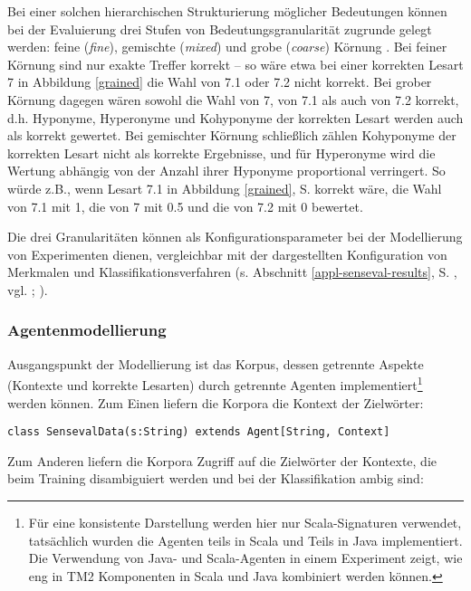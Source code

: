 \documentclass[abstracton, 12pt]{scrartcl}
\begin{document}
Bei einer solchen hierarchischen Strukturierung möglicher Bedeutungen können bei der Evaluierung drei Stufen von Bedeutungsgranularität zugrunde gelegt werden: feine (\emph{fine}), gemischte (\emph{mixed}) und grobe (\emph{coarse}) Körnung \citep[79]{PalmerEtAl2006}. Bei feiner Körnung sind nur exakte Treffer korrekt -- so wäre etwa bei einer korrekten Lesart 7 in Abbildung \ref{grained} die Wahl von 7.1 oder 7.2 nicht korrekt. Bei grober Körnung dagegen wären sowohl die Wahl von 7, von 7.1 als auch von 7.2 korrekt, d.h. Hyponyme, Hyperonyme und Kohyponyme der korrekten Lesart werden auch als korrekt gewertet. Bei gemischter Körnung schließlich zählen Kohyponyme der korrekten Lesart nicht als korrekte Ergebnisse, und für Hyperonyme wird die Wertung abhängig von der Anzahl ihrer Hyponyme proportional verringert. So würde z.B., wenn Lesart 7.1 in Abbildung \ref{grained}, S. \pageref{grained} korrekt wäre, die Wahl von 7.1 mit 1, die von 7 mit 0.5 und die von 7.2 mit 0 bewertet. 

Die drei Granularitäten können als Konfigurationsparameter bei der Modellierung von Experimenten dienen, vergleichbar mit der dargestellten Konfiguration von Merkmalen und Klassifikationsverfahren (s. Abschnitt \ref{appl-senseval-results}, S. \pageref{appl-senseval-results}, vgl. \citealt[16]{AgirreAndEdmonds2006b}; \citealt{MihalceaEtAl2004}).
  
\subsubsection{Agentenmodellierung} \label{agentenmodellierung}

Ausgangspunkt der Modellierung ist das Korpus, dessen getrennte Aspekte (Kontexte und korrekte Lesarten) durch getrennte Agenten implementiert\footnote{Für eine konsistente Darstellung werden hier nur Scala-Signaturen verwendet, tatsächlich wurden die Agenten teils in Scala und Teils in Java implementiert. Die Verwendung von Java- und Scala-Agenten in einem Experiment zeigt, wie eng in TM2 Komponenten in Scala und Java kombiniert werden können.} werden können. Zum Einen liefern die Korpora die Kontext der Zielwörter:

\begin{lstlisting}
class SensevalData(s:String) extends Agent[String, Context]
\end{lstlisting}

Zum Anderen liefern die Korpora Zugriff auf die Zielwörter der Kontexte, die beim Training disambiguiert werden und bei der Klassifikation ambig sind:
\end{document}
